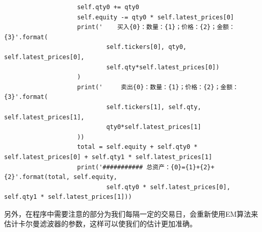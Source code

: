 \documentclass{article}
\begin{document}
\begin{lstlisting}
                    self.qty0 += qty0
                    self.equity -= qty0 * self.latest_prices[0]
                    print('    买入{0}：数量：{1}；价格：{2}；金额：{3}'.format(
                            self.tickers[0], qty0, self.latest_prices[0], 
                            self.qty*self.latest_prices[0])
                    )
                    print('     卖出{0}：数量：{1}；价格：{2}；金额：{3}'.format(
                            self.tickers[1], self.qty, self.latest_prices[1],
                            qty0*self.latest_prices[1]
                    ))
                    total = self.equity + self.qty0 * self.latest_prices[0] + self.qty1 * self.latest_prices[1]
                    print('########### 总资产：{0}={1}+{2}+{2}'.format(total, self.equity, 
                            self.qty0 * self.latest_prices[0], self.qty1 * self.latest_prices[1]))
\end{lstlisting}
另外，在程序中需要注意的部分为我们每隔一定的交易日，会重新使用EM算法来估计卡尔曼滤波器的参数，这样可以使我们的估计更加准确。
\end{document}
